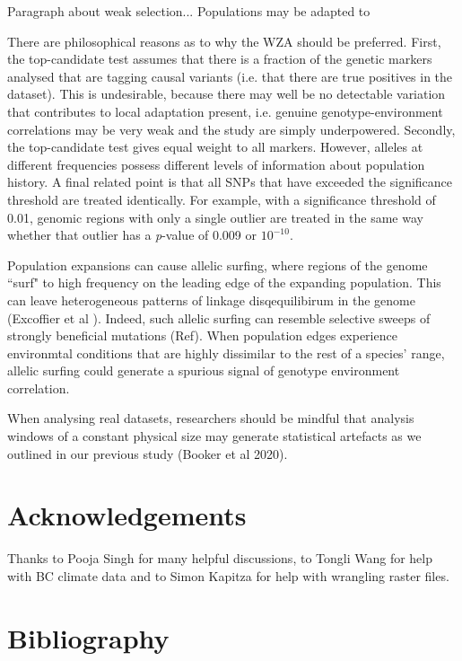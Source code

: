 \documentclass[11pt,twoside,lineno]{GSA_format}
\begin{document}
Paragraph about weak selection...
Populations may be adapted to 



There are philosophical reasons as to why the WZA should be preferred. First, the top-candidate test assumes that there is a fraction of the genetic markers analysed that are tagging causal variants (i.e. that there are true positives in the dataset). This is undesirable, because there may well be no detectable variation that contributes to local adaptation present, i.e. genuine genotype-environment correlations may be very weak and the study are simply underpowered. Secondly, the top-candidate test gives equal weight to all markers. However, alleles at different frequencies possess different levels of information about population history. A final related point is that all SNPs that have exceeded the significance threshold are treated identically. For example, with a significance threshold of 0.01, genomic regions with only a single outlier are treated in the same way whether that outlier has a \textit{p}-value of 0.009 or $10^{-10}$.

Population expansions can cause allelic surfing, where regions of the genome ``surf" to high frequency on the leading edge of the expanding population. This can leave heterogeneous patterns of linkage disqequilibirum in the genome (Excoffier et al ). Indeed, such allelic surfing can resemble selective sweeps of strongly beneficial mutations (Ref). When population edges experience environmtal conditions that are highly dissimilar to the rest of a species' range, allelic surfing could generate a spurious signal of genotype environment correlation.


When analysing real datasets, researchers should be mindful that analysis windows of a constant physical size may generate statistical artefacts as we outlined in our previous study (Booker et al 2020).


\section{Acknowledgements}

Thanks to Pooja Singh for many helpful discussions, to Tongli Wang for help with BC climate data and to Simon Kapitza for help with wrangling raster files. 


\section{Bibliography}
\end{document}

